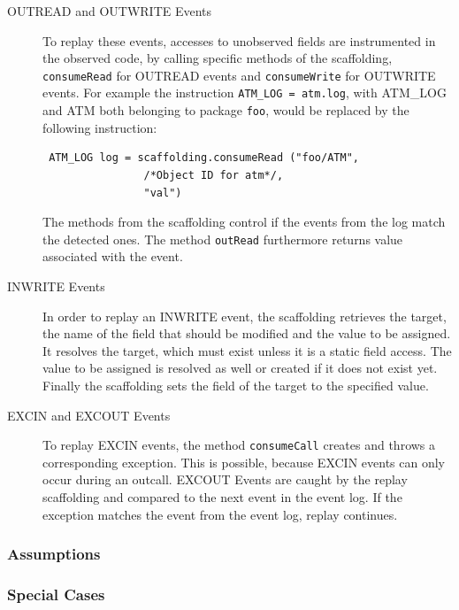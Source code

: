 \begin{description}
 \item [OUTREAD and OUTWRITE Events] To replay these events, accesses to unobserved fields are instrumented in the observed code, by calling specific methods of the scaffolding, \texttt{consumeRead} for OUTREAD events and \texttt{consumeWrite} for OUTWRITE events. For example the instruction \texttt{ATM\_LOG = atm.log}, with ATM\_LOG and ATM both belonging to package \texttt{foo}, would be replaced by the following instruction:
\begin{lstlisting}
 ATM_LOG log = scaffolding.consumeRead ("foo/ATM",
                /*Object ID for atm*/,
                "val")
\end{lstlisting}
The methods from the scaffolding control if the events from the log match the detected ones. The method \texttt{outRead} furthermore returns value associated with the event.
 \item [INWRITE Events] In order to replay an INWRITE event, the scaffolding retrieves the target, the name of the field that should be modified and the value to be assigned. It resolves the target, which must exist unless it is a static field access. The value to be assigned is resolved as well or created if it does not exist yet. Finally the scaffolding sets the field of the target to the specified value.
 \item [EXCIN and EXCOUT Events]  To replay EXCIN events, the method \texttt{consumeCall} creates and throws a corresponding exception. This is possible, because EXCIN events can only occur during an outcall. EXCOUT Events are caught by the replay scaffolding and compared to the next event in the event log. If the exception matches the event from the event log, replay continues.
\end{description}

\subsubsection{Assumptions}
\subsubsection{Special Cases}

